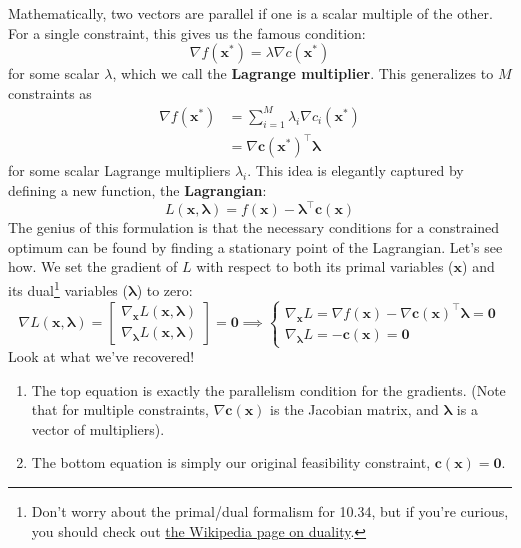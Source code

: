 Mathematically, two vectors are parallel if one is a scalar multiple of the other. For a single constraint, this gives us the famous condition:
\begin{equation}
\nabla f(\mathbf{x}^*) = \lambda \nabla c(\mathbf{x}^*)
\end{equation}
for some scalar $\lambda$, which we call the \textbf{Lagrange multiplier}. This generalizes to $M$ constraints as
\begin{equation}
\begin{aligned}
    \nabla f(\mathbf{x}^*) &= \sum_{i=1}^M \lambda_i \nabla c_i(\mathbf{x}^*) \\
    &= \nabla \mathbf{c}(\mathbf{x}^*)^{\top} \boldsymbol{\lambda}
\end{aligned}
\end{equation}
for some scalar Lagrange multipliers $\lambda_i$. This idea is elegantly captured by defining a new function, the \textbf{Lagrangian}:
\begin{equation}
L(\mathbf{x}, \boldsymbol{\lambda}) = f(\mathbf{x}) - \boldsymbol{\lambda}^{\top}\mathbf{c}(\mathbf{x})
\end{equation}
The genius of this formulation is that the necessary conditions for a constrained optimum can be found by finding a stationary point of the Lagrangian. Let's see how. We set the gradient of $L$ with respect to both its primal variables ($\mathbf{x}$) and its dual\footnote{Don't worry about the primal/dual formalism for 10.34, but if you're curious, you should check out \href{https://en.wikipedia.org/wiki/Duality_(optimization)}{the Wikipedia page on duality}.} variables ($\boldsymbol{\lambda}$) to zero:
\begin{equation}
\nabla L(\mathbf{x}, \boldsymbol{\lambda}) 
=
\begin{bmatrix}
\nabla_{\mathbf{x}} L(\mathbf{x},\boldsymbol{\lambda}) \\
\nabla_{\boldsymbol{\lambda}} L(\mathbf{x},\boldsymbol{\lambda})
\end{bmatrix}
= \mathbf{0} 
\implies
\begin{cases}
\nabla_{\mathbf{x}} L = \nabla f(\mathbf{x}) - \nabla \mathbf{c}(\mathbf{x})^{\top} \boldsymbol{\lambda} = \mathbf{0} \\
\nabla_{\boldsymbol{\lambda}} L = -\mathbf{c}(\mathbf{x}) = \mathbf{0}
\end{cases}
\end{equation}
Look at what we've recovered!
\begin{enumerate}
    \item The top equation is exactly the parallelism condition for the gradients. (Note that for multiple constraints, $\nabla \mathbf{c}(\mathbf{x})$ is the Jacobian matrix, and $\boldsymbol{\lambda}$ is a vector of multipliers).
    \item The bottom equation is simply our original feasibility constraint, $\mathbf{c}(\mathbf{x}) = \mathbf{0}$.
\end{enumerate}

